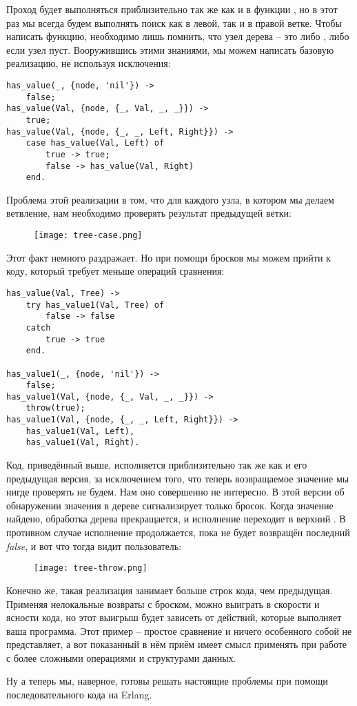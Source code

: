 Проход будет выполняться приблизительно так же как и в функции , но в этот раз мы всегда будем выполнять поиск как в левой, так и в правой ветке.
Чтобы написать функцию, необходимо лишь помнить, что узел дерева \--- это либо , либо  если узел пуст.
Вооружившись этими знаниями, мы можем написать базовую реализацию, не используя исключения:
\begin{lstlisting}[style=erlang]
%% looks for a given value 'Val' in the tree.
has_value(_, {node, 'nil'}) ->
    false;
has_value(Val, {node, {_, Val, _, _}}) ->
    true;
has_value(Val, {node, {_, _, Left, Right}}) ->
    case has_value(Val, Left) of
        true -> true;
        false -> has_value(Val, Right)
    end.
\end{lstlisting}

Проблема этой реализации в том, что для каждого узла, в котором мы делаем ветвление, нам необходимо проверять результат предыдущей ветки:
\blankline
\blankline
\begin{figure}[h!]
    \centering
    \texttt{[image: tree-case.png]}
\end{figure}

Этот факт немного раздражает.
Но при помощи бросков мы можем прийти к коду, который требует меньше операций сравнения:
\begin{lstlisting}[style=erlang]
has_value(Val, Tree) ->
    try has_value1(Val, Tree) of
        false -> false
    catch
        true -> true
    end.
 
has_value1(_, {node, 'nil'}) ->
    false;
has_value1(Val, {node, {_, Val, _, _}}) ->
    throw(true);
has_value1(Val, {node, {_, _, Left, Right}}) ->
    has_value1(Val, Left),
    has_value1(Val, Right).
\end{lstlisting}

Код, приведённый выше, исполняется приблизительно так же как и его предыдущая версия, за исключением того, что теперь возвращаемое значение мы нигде проверять не будем.
Нам оно совершенно не интересно.
В этой версии об обнаружении значения в дереве сигнализирует только бросок.
Когда значение найдено, обработка дерева прекращается, и исполнение переходит в верхний .
В противном случае исполнение продолжается, пока не будет возвращён последний \emph{false}, и вот что тогда видит пользователь:
\begin{figure}[h!]
    \centering
    \texttt{[image: tree-throw.png]}
\end{figure}

Конечно же, такая реализация занимает больше строк кода, чем предыдущая.
Применяя нелокальные возвраты с броском, можно выиграть в скорости и ясности кода, но этот выигрыш будет зависеть от действий, которые выполняет ваша программа.
Этот пример \--- простое сравнение и ничего особенного собой не представляет, а вот показанный в нём приём имеет смысл применять при работе с более сложными операциями и структурами данных.

Ну а теперь мы, наверное, готовы решать настоящие проблемы при помощи последовательного кода на Erlang.
